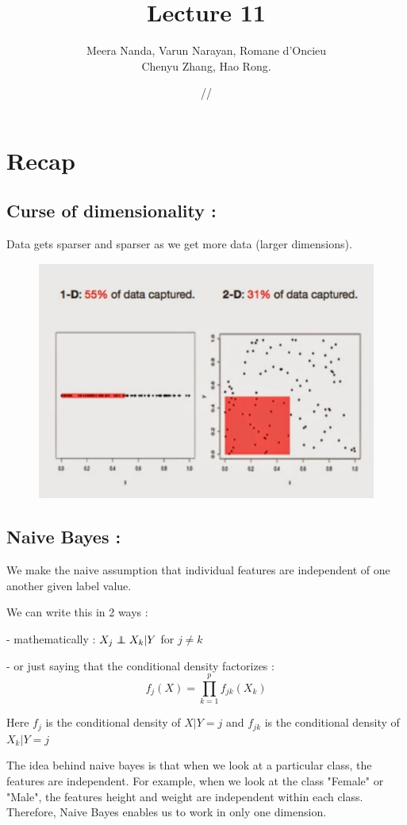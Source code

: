 \documentclass[11pt]{report}
\title{\textbf{Lecture 11}}
\author{Meera Nanda, Varun Narayan, Romane d'Oncieu \\Chenyu Zhang, Hao Rong.}
\date{\oldstylenums{10}/\oldstylenums{02}/\oldstylenums{18}}
\newcommand\independent{\protect\mathpalette{\protect\independenT}{\perp}}
\def\independenT#1#2{\mathrel{\rlap{$#1#2$}\mkern2mu{#1#2}}}
\begin{document}
\maketitle
\renewcommand{\chaptername}{}
\renewcommand{\thechapter}{}
\renewcommand{\thesection}{}
\renewcommand{\thesubsection}{}

 
\section{Recap}
\subsection{Curse of dimensionality :}
Data gets sparser and sparser as we get more data (larger dimensions).

\begin{figure}[ht]
    \centering
    \includegraphics[width=0.4\linewidth]{image_1.JPG}
    \captionsetup{labelformat=empty}
\end{figure}

\subsection{Naive Bayes :}
We make the naive assumption that individual features are independent of one another given label value.

We can write this in 2 ways : 

- mathematically : $X_j \independent X_k | Y $ for $j\neq k$

- or just saying that the conditional density factorizes : 
\[f_j(X)=\prod_{k=1}^{p} f_{jk}(X_k)\]

Here $f_j$ is the conditional density of $X|Y=j$ and $f_{jk}$ is the conditional density of $X_k | Y=j$

The idea behind naive bayes is that when we look at a particular class, the features are independent. For example, when we look at the class "Female" or "Male", the features height and weight are independent within each class. Therefore, Naive Bayes enables us to work in only one dimension. 
\end{document}
